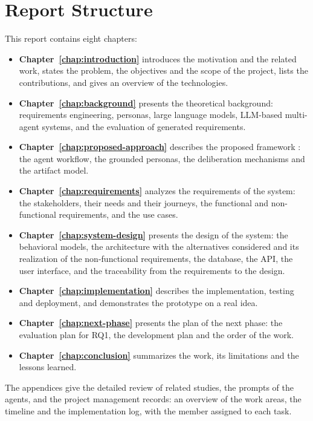 \section{Report Structure}
\label{sec:report-structure}

This report contains eight chapters:
\begin{itemize}
    \item \textbf{Chapter~\ref{chap:introduction}} introduces the motivation and the related work, states the problem, the objectives and the scope of the project, lists the contributions, and gives an overview of the technologies.
    \item \textbf{Chapter~\ref{chap:background}} presents the theoretical background: requirements engineering, personas, large language models, LLM-based multi-agent systems, and the evaluation of generated requirements.
    \item \textbf{Chapter~\ref{chap:proposed-approach}} describes the proposed framework \sysname{}: the agent workflow, the grounded personas, the deliberation mechanisms and the artifact model.
    \item \textbf{Chapter~\ref{chap:requirements}} analyzes the requirements of the system: the stakeholders, their needs and their journeys, the functional and non-functional requirements, and the use cases.
    \item \textbf{Chapter~\ref{chap:system-design}} presents the design of the system: the behavioral models, the architecture with the alternatives considered and its realization of the non-functional requirements, the database, the API, the user interface, and the traceability from the requirements to the design.
    \item \textbf{Chapter~\ref{chap:implementation}} describes the implementation, testing and deployment, and demonstrates the prototype on a real idea.
    \item \textbf{Chapter~\ref{chap:next-phase}} presents the plan of the next phase: the evaluation plan for RQ1, the development plan and the order of the work.
    \item \textbf{Chapter~\ref{chap:conclusion}} summarizes the work, its limitations and the lessons learned.
\end{itemize}
The appendices give the detailed review of related studies, the prompts of the agents, and the project management records: an overview of the work areas, the timeline and the implementation log, with the member assigned to each task.
